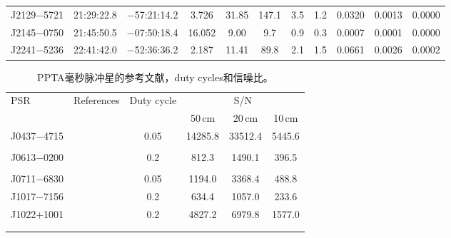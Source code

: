 \begin{landscape}
\begin{table}
\begin{center}
\begin{tabular}{lcccccccccc}
J2129$-$5721& 21:29:22.8  &  $-$57:21:14.2 &  3.726  &  31.85    & 147.1    & 3.5       & 1.2    &  0.0320  &  0.0013  &  0.0000  \\ 
J2145$-$0750& 21:45:50.5  &  $-$07:50:18.4 &  16.052 &  9.00     & 9.7      & 0.9       & 0.3    &  0.0007  &  0.0001  &  0.0000  \\ 
J2241$-$5236& 22:41:42.0  &  $-$52:36:36.2 &  2.187  &  11.41    & 89.8     & 2.1       & 1.5    &  0.0661  &  0.0026  &  0.0002  \\ 
%
\hline
\end{tabular}
\end{center}
\end{table}
\end{landscape}


\begin{table}
\centering
\caption{PPTA毫秒脉冲星的参考文献，duty cycles和信噪比。}
\label{ref}
\begin{tabular}{lccccc}
\hline
PSR          &    References                       &  Duty cycle           &    \multicolumn{3}{c}{S/N}                   \\  
             &                                     &                       &    50\,cm    &  20\,cm      &  10\,cm        \\   
\hline
J0437$-$4715 & \cite{Johnston93,Manchester95a}   & 0.05  &    14285.8 	 &   33512.4  	&     5445.6    \\  
             & \cite{Navarro97,Yan11a}             &       &               &              &               \\  
J0613$-$0200 & \cite{Xilouris98,Stairs99}         & 0.2   &      812.3 	 &    1490.1  	&      396.5    \\  
             & \cite{Ord04,Yan11a}                 &       &               &              &               \\  
J0711$-$6830 & \cite{Manchester04,Ord04,Yan11a}    & 0.05  &     1194.0 	 &    3368.4  	&      488.8    \\  
J1017$-$7156 & \cite{Keith12}                     & 0.2   &      634.4 	 &    1057.0  	&      233.6    \\
J1022$+$1001 & \cite{Xilouris98,1022Kramer99}     & 0.2   &     4827.2 	 &    6979.8  	&     1577.0    \\  
             & \cite{Stairs99,Ord04,Yan11a}        &       &               &              &               \\
             &                                    &       &               &              &               \\

\end{tabular}
\end{table}
